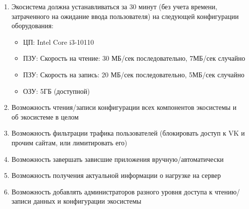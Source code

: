 \begin{enumerate}[label={\bfseries ПТ-\arabic*}]
\begin{enumerate}[label*={\bfseries.\arabic*}]
            \item Экосистема должна устанавливаться за 30 минут (без учета времени, затраченного на
                  ожидание ввода пользователя) на следующей конфигурации оборудования:
                  \begin{itemize}
                     \item ЦП: Intel Core i3-10110
                     \item ПЗУ: Скорость на чтение: 30 МБ/сек последовательно, 7МБ/сек случайно
                     \item ПЗУ: Скорость на запись: 20 МБ/сек последовательно, 5МБ/сек случайно
                     \item ОЗУ: 5ГБ (доступной)
                  \end{itemize}
            \item Возможность чтения/записи конфигурации всех компонентов экосистемы и об экосистеме в целом
            \item Возможность фильтрации трафика пользователей (блокировать доступ к VK и прочим сайтам, или лимитировать его)
            \item Возможность завершать зависшие приложения вручную/автоматически
            \item Возможность получения актуальной информации о нагрузке на сервер
            \item Возможность добавлять администраторов разного уровня доступа к чтению/записи данных и конфигурации экосистемы
         \end{enumerate}
\end{enumerate}

